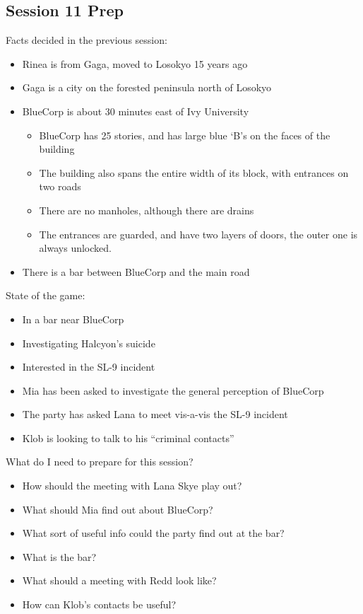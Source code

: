 \subsection{Session 11 Prep}

Facts decided in the previous session:
\begin{itemize}
\item Rinea is from Gaga, moved to Losokyo 15 years ago
\item Gaga is a city on the forested peninsula north of Losokyo
\item BlueCorp is about 30 minutes east of Ivy University
\begin{itemize}
\item BlueCorp has 25 stories, and has large blue `B's on the faces of the building
\item The building also spans the entire width of its block, with entrances on two roads
\item There are no manholes, although there are drains
\item The entrances are guarded, and have two layers of doors, the outer one is always unlocked.
\end{itemize}
\item There is a bar between BlueCorp and the main road
\end{itemize}

State of the game:
\begin{itemize}
\item In a bar near BlueCorp
\item Investigating Halcyon's suicide
\item Interested in the SL-9 incident
\item Mia has been asked to investigate the general perception of BlueCorp
\item The party has asked Lana to meet vis-a-vis the SL-9 incident
\item Klob is looking to talk to his ``criminal contacts''
\end{itemize}

What do I need to prepare for this session?
\begin{itemize}
\item How should the meeting with Lana Skye play out?
\item What should Mia find out about BlueCorp?
\item What sort of useful info could the party find out at the bar?
\item What is the bar?
\item What should a meeting with Redd look like?
\item How can Klob's contacts be useful?
\end{itemize}

